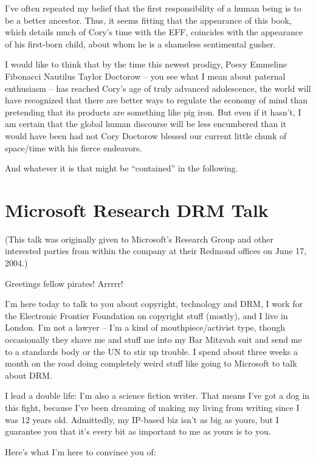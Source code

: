 I've often repeated my belief that the first responsibility of a
human being is to be a better ancestor. Thus, it seems fitting that
the appearance of this book, which details much of Cory's time with
the EFF, coincides with the appearance of his first-born child,
about whom he is a shameless sentimental gusher.

I would like to think that by the time this newest prodigy, Poesy
Emmeline Fibonacci Nautilus Taylor Doctorow -- you see what I mean
about paternal enthusiasm -- has reached Cory's age of truly
advanced adolescence, the world will have recognized that there are
better ways to regulate the economy of mind than pretending that
its products are something like pig iron. But even if it hasn't, I
am certain that the global human discourse will be less encumbered
than it would have been had not Cory Doctorow blessed our current
little chunk of space/time with his fierce endeavors.

And whatever it is that might be ``contained'' in the following.

\section{Microsoft Research DRM Talk}

(This talk was originally given to Microsoft's Research Group and
other interested parties from within the company at their Redmond
offices on June 17, 2004.)

Greetings fellow pirates! Arrrrr!

I'm here today to talk to you about copyright, technology and DRM,
I work for the Electronic Frontier Foundation on copyright stuff
(mostly), and I live in London. I'm not a lawyer -- I'm a kind of
mouthpiece/activist type, though occasionally they shave me and
stuff me into my Bar Mitzvah suit and send me to a standards body
or the UN to stir up trouble. I spend about three weeks a month on
the road doing completely weird stuff like going to Microsoft to
talk about DRM.

I lead a double life: I'm also a science fiction writer. That means
I've got a dog in this fight, because I've been dreaming of making
my living from writing since I was 12 years old. Admittedly, my
IP-based biz isn't as big as yours, but I guarantee you that it's
every bit as important to me as yours is to you.

Here's what I'm here to convince you of:

